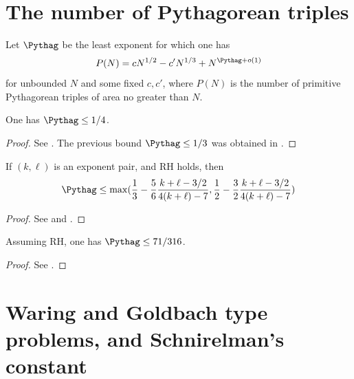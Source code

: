 \chapter{The number of Pythagorean triples}\label{pythagorean-chapter}

\begin{definition}\label{pythag-def}  Let $\Pythag$ be the least exponent for which one has
$$ P(N) = c N^{1/2} - c' N^{1/3} + N^{\Pythag+o(1)}$$
for unbounded $N$ and some fixed $c,c'$, where $P(N)$ is the number of primitive Pythagorean triples of area no greater than $N$.
\end{definition}

\begin{lemma}\label{pythag-14} One has $\Pythag \leq 1/4$.
\end{lemma}

\begin{proof} See \cite{wild_1955, duttlinger_schwarz}.  The previous bound $\Pythag \leq 1/3$ was obtained in \cite{lambek_moser}.
\end{proof}

\begin{lemma}\label{exp_pair_to_pythag} If $(k,\ell)$ is an exponent pair, and RH holds, then
$$ \Pythag \leq \max( \frac{1}{3} - \frac{5}{6} \frac{k+\ell-3/2}{4(k+\ell)-7}, \frac{1}{2} - \frac{3}{2}\frac{k+\ell-3/2}{4(k+\ell)-7} )$$
\end{lemma}

\begin{proof} See \cite{menzer} and \cite[Section 5.10]{trudgian-yang}.
\end{proof}

\begin{lemma}\label{pythag-71-316} Assuming RH, one has $\Pythag \leq 71/316$.
\end{lemma}

\begin{proof} See \cite[Section 5.10]{trudgian-yang}.
\end{proof}


\chapter{Waring and Goldbach type problems, and Schnirelman's constant}\label{waring-goldbach-schnirelman-chapter}

